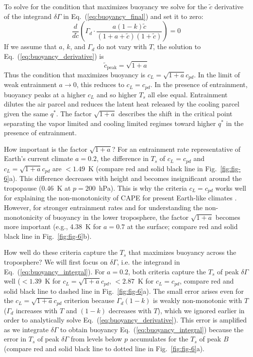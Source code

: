 \documentclass[draft,twocol]{ametsocV6.1}
\begin{document}
To solve for the condition that maximizes buoyancy we solve for the $\tilde{c}$ derivative of the integrand $\delta \Gamma$ in Eq.~(\ref{eq:buoyancy_final}) and set it to zero:
\begin{equation}
    \frac{d}{d \tilde{c}}\left(\Gamma_d \cdot \frac{a(1-k)\tilde{c}}{(1+a+\tilde{c})(1+\tilde{c})}\right) = 0 \label{eq:buoyancy_derivative}
\end{equation}
If we assume that $a$, $k$, and $\Gamma_d$ do not vary with $T$, the solution to Eq.~(\ref{eq:buoyancy_derivative}) is
\begin{equation}
    \tilde{c}_\text{peak}=\sqrt{1+a} \label{eq:buoyancy_quadratic}
\end{equation}
Thus the condition that maximizes buoyancy is $c_L = \sqrt{1+a} c_{pd}$. In the limit of weak entrainment $a \to 0$, this reduces to $c_L = c_{pd}$. In the presence of entrainment, buoyancy peaks at a higher $c_L$ and so higher $T_s$ all else equal. Entrainment dilutes the air parcel and reduces the latent heat released by the cooling parcel given the same $q^*$. The factor $\sqrt{1+a}$ describes the shift in the critical point separating the vapor limited and cooling limited regimes toward higher $q^*$ in the presence of entrainment.

How important is the factor $\sqrt{1+a}$? For an entrainment rate representative of Earth's current climate $a=0.2$, the difference in $T_s$ of $c_L=c_{pd}$ and $c_L=\sqrt{1+a}c_{pd}$ are $< 1.49$~K (compare red and solid black line in Fig.~\ref{fig:fig-6}a). This difference decreases with height and becomes insignificant around the tropopause (0.46~K at $p=200$~hPa). This is why the criteria $c_L = c_{pd}$ works well for explaining the non-monotonicity of CAPE for present Earth-like climates \citep{romps2016}. However, for stronger entrainment rates and for understanding the non-monotonicity of buoyancy in the lower troposphere, the factor $\sqrt{1+a}$ becomes more important (e.g., 4.38~K for $a=0.7$ at the surface; compare red and solid black line in Fig.~\ref{fig:fig-6}b).

How well do these criteria capture the $T_s$ that maximizes buoyancy across the troposphere? We will first focus on $\delta \Gamma$, i.e. the integrand in Eq.~(\ref{eq:buoyancy_integral}). For $a=0.2$, both criteria capture the $T_s$ of peak $\delta \Gamma$ well ($<1.39$~K for $c_L=\sqrt{1+a}c_{pd}$, $< 2.87$~K for $c_L=c_{pd}$, compare red and solid black line to dashed line in Fig.~\ref{fig:fig-6}a). The small error arises even for the $c_L=\sqrt{1+a}c_{pd}$ criterion because $\Gamma_d(1-k)$ is weakly non-monotonic with $T$ ($\Gamma_d$ increases with $T$ and $(1-k)$ decreases with $T$), which we ignored earlier in order to analytically solve Eq.~(\ref{eq:buoyancy_derivative}). This error is amplified as we integrate $\delta \Gamma$ to obtain buoyancy Eq.~(\ref{eq:buoyancy_integral}) because the error in $T_s$ of peak $\delta \Gamma$ from levels below $p$ accumulates for the $T_s$ of peak $B$ (compare red and solid black line to dotted line in Fig.~\ref{fig:fig-6}a).
\end{document}
